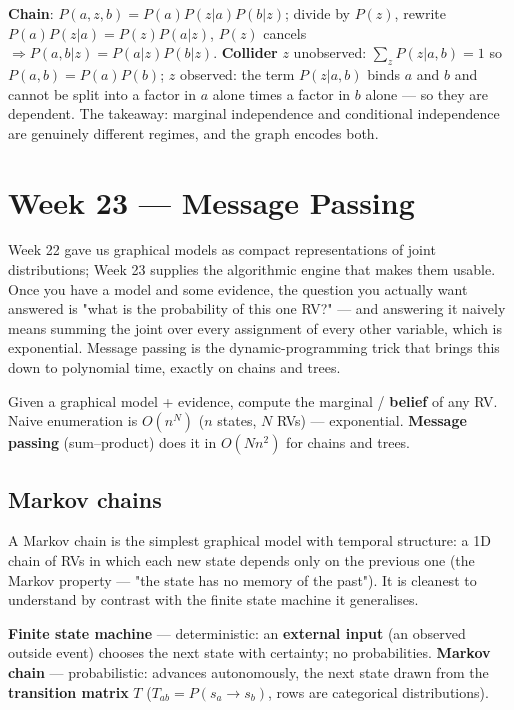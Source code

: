 \documentclass[11pt, a4paper]{article}
\newcommand{\kw}[1]{\textbf{#1}}
\begin{document}
\begin{notebox}
\kw{Chain}: $P(a,z,b)=P(a)P(z|a)P(b|z)$; divide by $P(z)$, rewrite $P(a)P(z|a)=P(z)P(a|z)$, $P(z)$
cancels $\Rightarrow P(a,b|z)=P(a|z)P(b|z)$. \kw{Collider} $z$ unobserved: $\sum_z P(z|a,b)=1$ so
$P(a,b)=P(a)P(b)$; $z$ observed: the term $P(z|a,b)$ binds $a$ and $b$ and cannot be split into a
factor in $a$ alone times a factor in $b$ alone — so they are dependent. The takeaway: marginal
independence and conditional independence are genuinely different regimes, and the graph encodes
both.
\end{notebox}

\section{Week 23 — Message Passing}

Week 22 gave us graphical models as compact representations of joint distributions; Week 23 supplies
the algorithmic engine that makes them usable. Once you have a model and some evidence, the question
you actually want answered is "what is the probability of this one RV?" — and answering it naively
means summing the joint over every assignment of every other variable, which is exponential.
Message passing is the dynamic-programming trick that brings this down to polynomial time, exactly
on chains and trees.

\begin{setupbox}
Given a graphical model + evidence, compute the marginal / \kw{belief} of any RV. Naive enumeration
is \kw{$O(n^N)$} ($n$ states, $N$ RVs) — exponential. \kw{Message passing} (sum--product) does it in
\kw{$O(Nn^2)$} for chains and trees.
\end{setupbox}

\subsection{Markov chains}

A Markov chain is the simplest graphical model with temporal structure: a 1D chain of RVs in which
each new state depends only on the previous one (the Markov property — "the state has no memory of
the past"). It is cleanest to understand by contrast with the finite state machine it generalises.

\begin{defbox}
\kw{Finite state machine} — deterministic: an \kw{external input} (an observed outside event) chooses
the next state with certainty; no probabilities. \kw{Markov chain} — probabilistic: advances
autonomously, the next state drawn from the \kw{transition matrix} $T$ ($T_{ab}=P(s_a\to s_b)$, rows
are categorical distributions).
\end{defbox}
\end{document}
